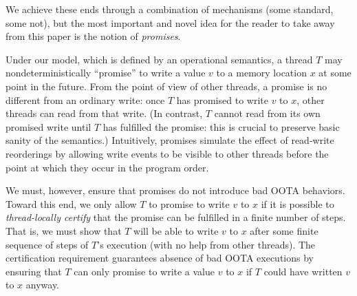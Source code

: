 



We achieve these ends through a combination of mechanisms (some
standard, some not), but the most important and novel idea for the
reader to take away from this paper is the notion of \emph{promises}.

Under our model, which is defined by an operational semantics, a thread $T$ may nondeterministically ``promise''
to write a value $v$ to a memory location $x$ at some point in the
future.  From the point of view of other threads, a promise is no
different from an ordinary write: once $T$ has promised to write $v$
to $x$, other threads can read from that write.  (In contrast, $T$
cannot read from its own promised write until $T$ has fulfilled the
promise: this is crucial to preserve basic sanity of the semantics.)
Intuitively, promises simulate the effect of read-write reorderings by
allowing write events to be visible to other threads before the point
at which they occur in the program order.

We must, however, ensure that promises do not introduce bad OOTA
behaviors.  Toward this end, we only allow $T$ to promise to write $v$
to $x$ if it is possible to \emph{thread-locally certify} that the
promise can be fulfilled in a finite number of steps.
That is, we must show that $T$
will be able to write $v$ to $x$ after some finite sequence of steps
of $T$'s execution (\ie with no help from other threads).  The
certification requirement guarantees absence of bad OOTA executions by
ensuring that $T$ can only promise to write a value $v$ to $x$ if $T$
could have written $v$ to $x$ anyway.

